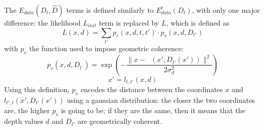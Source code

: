 \documentclass[notitlepage,english]{hgbreport}
\begin{document}
The $E_{data}(D_t, \hat D)$ terms is defined similarly to $E^t_{data}(D_t)$, with only one major difference: the likelihood $L_{init}$ term is replaced by $L$, which is defined as
$$
L(x, d) = \sum_{t'} p_c(x,d,t,t')\cdot p_v(x, d, D_{t'})
$$
with $p_v$ the function used to impose geometric coherence:
\begin{equation} \label{eq:pv}
	p_v(x,d,D_{t^\prime}) = \exp \left(-\frac{\lVert x - \mathop{l_{t',t}}(x', D_{t'}(x')) \rVert^2}{2\sigma^2_d}\right)
\end{equation}
$$x'= l_{t,t'}(x,d)$$
Using this definition, $p_v$ encodes the distance between the coordinates $x$ and $l_{t',t}(x', D_{t'}(x'))$ using a gaussian distribution: the closer the two coordinates are, the higher $p_v$ is going to be; if they are the same, then it means that the depth values $d$ and $D_{t'}$ are geometrically coherent.
\end{document}
